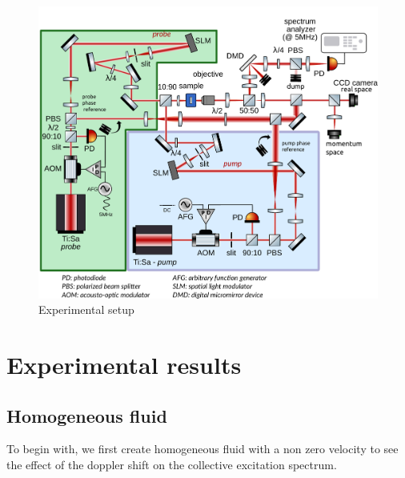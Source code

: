  \begin{figure}
    \centering
    \includegraphics[width=1\textwidth]{chap3_custom_st/fig/set_up_spacetime.pdf}
    \caption{Experimental setup}
    \label{fig:setup}
\end{figure}





\section{Experimental results}

\subsection{Homogeneous fluid}

To begin with, we first create homogeneous fluid with a non zero velocity to see the effect of the doppler shift on the collective excitation spectrum. 